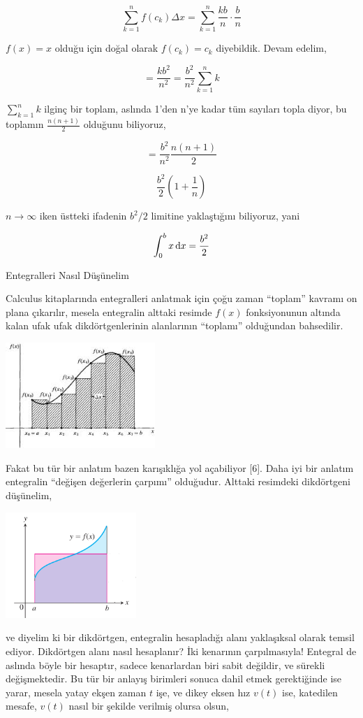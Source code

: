 \documentclass[12pt,fleqn]{article}\usepackage{../../common}
\begin{document}
$$ 
\sum_{k=1}^{n} f(c_k) \Delta x = \sum_{k=1}^{n} \frac{kb}{n} \cdot \frac{b}{n}
$$

$f(x) = x$ olduğu için doğal olarak $f(c_k)=c_k$ diyebildik. Devam edelim, 

$$ 
= \frac{kb^2}{n^2} = \frac{b^2}{n^2} \sum_{k=1}^{n} k
$$

$\sum_{k=1}^{n} k$ ilginç bir toplam, aslında 1'den n'ye kadar tüm
sayıları topla diyor, bu toplamın $\frac{n(n+1)}{2}$ olduğunu biliyoruz, 

$$ 
= \frac{b^2}{n^2} \frac{n(n+1)}{2}
$$

$$ 
\frac{b^2}{2} (1 + \frac{1}{n})
$$

$n \to \infty$ iken üstteki ifadenin $b^2/2$ limitine yaklaştığını
biliyoruz, yani

$$ 
\int_{0}^{b} x \,\mathrm{d} x = \frac{b^2}{2}
$$

Entegralleri Nasıl Düşünelim

Calculus kitaplarında entegralleri anlatmak için çoğu zaman ``toplam''
kavramı on plana çıkarılır, mesela entegralin alttaki resimde $f(x)$
fonksiyonunun altında kalan ufak ufak dikdörtgenlerinin alanlarının
``toplamı'' olduğundan bahsedilir.

\includegraphics[height=4cm]{area.png}

Fakat bu tür bir anlatım bazen karışıklığa yol açabiliyor [6]. Daha iyi bir
anlatım entegralin ``değişen değerlerin çarpımı'' olduğudur. Alttaki
resimdeki dikdörtgeni düşünelim, 

\includegraphics[height=4cm]{box.png}

ve diyelim ki bir dikdörtgen, entegralin hesapladığı alanı yaklaşıksal
olarak temsil ediyor. Dikdörtgen alanı nasıl hesaplanır? İki kenarının
çarpılmasıyla! Entegral de aslında böyle bir hesaptır, sadece kenarlardan
biri sabit değildir, ve sürekli değişmektedir. Bu tür bir anlayış birimleri
sonuca dahil etmek gerektiğinde ise yarar, mesela yatay ekşen zaman $t$
işe, ve dikey eksen hız $v(t)$ ise, katedilen mesafe, $v(t)$ nasıl bir
şekilde verilmiş olursa olsun,
\end{document}
